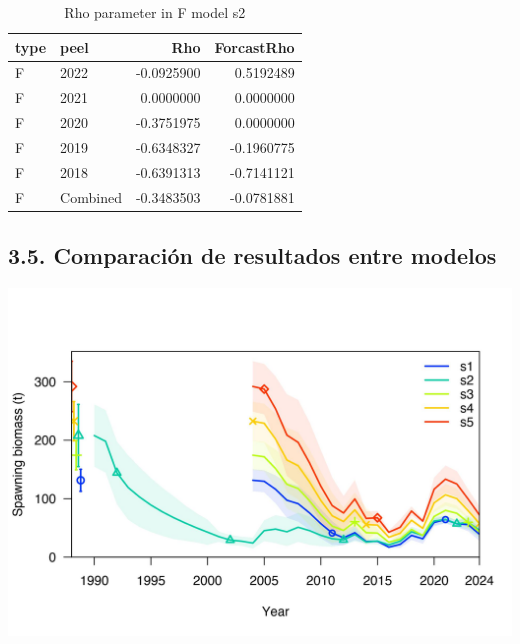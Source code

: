 \documentclass[
]{article}
\begin{document}
\begin{table}[H]

\caption{\label{tab:unnamed-chunk-16}Rho parameter in F model s2}
\centering
\begin{tabular}[t]{llrr}
\toprule
type & peel & Rho & ForcastRho\\
\midrule
F & 2022 & -0.0925900 & 0.5192489\\
F & 2021 & 0.0000000 & 0.0000000\\
F & 2020 & -0.3751975 & 0.0000000\\
F & 2019 & -0.6348327 & -0.1960775\\
F & 2018 & -0.6391313 & -0.7141121\\
\addlinespace
F & Combined & -0.3483503 & -0.0781881\\
\bottomrule
\end{tabular}
\end{table}

\pagebreak

\hypertarget{comparaciuxf3n-de-resultados-entre-modelos}{%
\subsection{3.5. Comparación de resultados entre modelos}\label{comparaciuxf3n-de-resultados-entre-modelos}}

\begin{center}\includegraphics{Dtrunculus_SS3_2024_files/figure-latex/unnamed-chunk-17-1} \end{center}
\end{document}
